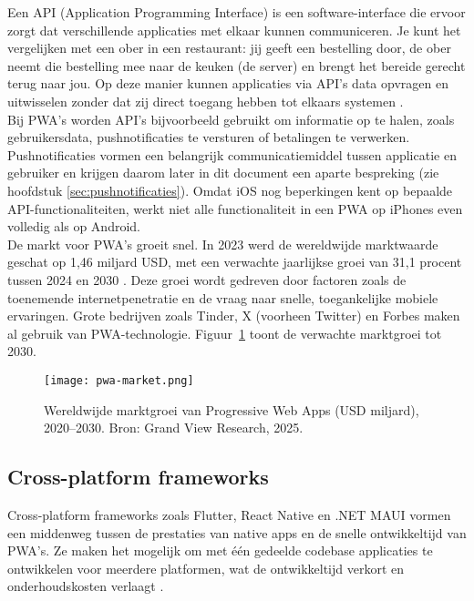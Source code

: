 Een API (Application Programming Interface) is een software-interface die ervoor zorgt dat verschillende applicaties met elkaar kunnen communiceren. Je kunt het vergelijken met een ober in een restaurant: jij geeft een bestelling door, de ober neemt die bestelling mee naar de keuken (de server) en brengt het bereide gerecht terug naar jou. Op deze manier kunnen applicaties via API’s data opvragen en uitwisselen zonder dat zij direct toegang hebben tot elkaars systemen \autocite{Schoemaker2019}.\\  

Bij PWA’s worden API’s bijvoorbeeld gebruikt om informatie op te halen, zoals gebruikersdata, pushnotificaties te versturen of betalingen te verwerken. Pushnotificaties vormen een belangrijk communicatiemiddel tussen applicatie en gebruiker en krijgen daarom later in dit document een aparte bespreking (zie hoofdstuk \ref{sec:pushnotificaties}). Omdat iOS nog beperkingen kent op bepaalde API-functionaliteiten, werkt niet alle functionaliteit in een PWA op iPhones even volledig als op Android.\\  

De markt voor PWA’s groeit snel. In 2023 werd de wereldwijde marktwaarde geschat op 1,46 miljard USD, met een verwachte jaarlijkse groei van 31,1 procent tussen 2024 en 2030 \autocite{Research2024}. Deze groei wordt gedreven door factoren zoals de toenemende internetpenetratie en de vraag naar snelle, toegankelijke mobiele ervaringen. Grote bedrijven zoals Tinder, X (voorheen Twitter) en Forbes maken al gebruik van PWA-technologie. Figuur~\ref{fig:pwa_market} toont de verwachte marktgroei tot 2030.\\  


\begin{figure}[h]
    \centering
    \texttt{[image: pwa-market.png]}
    \caption{Wereldwijde marktgroei van Progressive Web Apps (USD miljard), 2020–2030. Bron: Grand View Research, 2025. \autocite{Research2024}}
    \label{fig:pwa_market}
\end{figure}

\subsection{Cross-platform frameworks}
Cross-platform frameworks zoals Flutter, React Native en .NET MAUI vormen een middenweg tussen de prestaties van native apps en de snelle ontwikkeltijd van PWA’s. Ze maken het mogelijk om met één gedeelde codebase applicaties te ontwikkelen voor meerdere platformen, wat de ontwikkeltijd verkort en onderhoudskosten verlaagt \autocite{Kuppan2024}.\\

